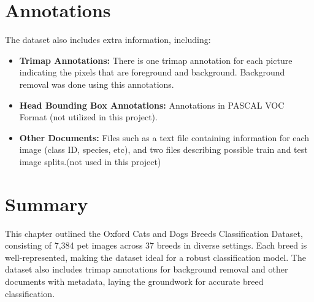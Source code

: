 \section{Annotations}
The dataset also includes extra information, including:
\begin{itemize}
    \item \textbf{Trimap Annotations:} There is one trimap annotation for each picture indicating the pixels that are foreground and background. Background removal was done using this annotations.
    
    \item \textbf{Head Bounding Box Annotations:} Annotations in PASCAL VOC Format (not utilized in this project).
    
    \item \textbf{Other Documents:} Files such as a text file containing information for each image (class ID, species, etc), and two files describing possible train and test image splits.(not used in this project)
\end{itemize}

\section{Summary} 
This chapter outlined the Oxford Cats and Dogs Breeds Classification Dataset, consisting of 7,384 pet images across 37 breeds in diverse settings. Each breed is well-represented, making the dataset ideal for a robust classification model. The dataset also includes trimap annotations for background removal and other documents with metadata, laying the groundwork for accurate breed classification.
